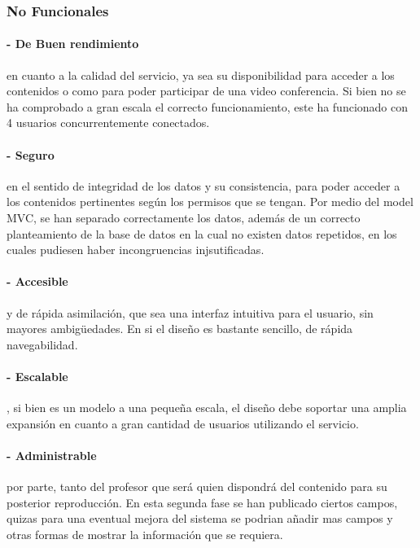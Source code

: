 \documentclass[12pt]{article}
\begin{document}
\newpage
\subsubsection{No Funcionales}

\paragraph{- De Buen rendimiento} en cuanto a la calidad del servicio, ya sea su disponibilidad para acceder a los 
contenidos o como para poder participar de una video conferencia. Si bien no se ha comprobado a gran escala
el correcto funcionamiento, este ha funcionado con 4 usuarios concurrentemente conectados.\\

\paragraph{- Seguro} en el sentido de integridad de los datos y su consistencia, para poder acceder a los contenidos
pertinentes según los permisos que se tengan. Por medio del model MVC, se han separado correctamente los datos, 
además de un correcto planteamiento de la base de datos en la cual no existen datos repetidos, en los cuales
pudiesen haber incongruencias injsutificadas.\\

\paragraph{- Accesible} y de rápida asimilación, que sea una interfaz intuitiva para el usuario, sin mayores
ambigüedades. En si el dise\~no es bastante sencillo, de rápida navegabilidad.\\

\paragraph{- Escalable}, si bien es un modelo a una peque\~na escala, el dise\~no debe soportar una amplia 
expansión en cuanto a gran cantidad de usuarios utilizando el servicio.\\

\paragraph{- Administrable} por parte, tanto del profesor que será quien dispondrá del contenido para su posterior
reproducción. En esta segunda fase se han publicado ciertos campos, quizas para una eventual mejora del sistema
se podrian a\~nadir mas campos y otras formas de mostrar la información que se requiera.\\
\end{document}
